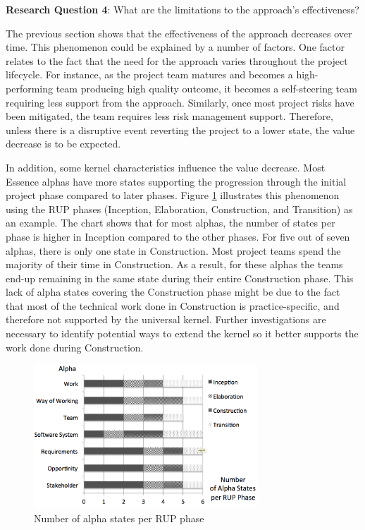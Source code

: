 \textbf{Research Question 4}: What are the limitations to the approach's effectiveness?

The previous section shows that the effectiveness of the approach decreases over time. This phenomenon could be explained by a number of factors. One factor relates to the fact that the need for the approach varies throughout the project lifecycle. For instance, as the project team matures and becomes a high-performing team producing high quality outcome, it becomes a self-steering team requiring less support from the approach. Similarly, once most project risks have been mitigated, the team requires less risk management support. Therefore, unless there is a disruptive event reverting the project to a lower state, the value decrease is to be expected.

In addition, some kernel characteristics influence the value decrease. Most Essence alphas have more states supporting the progression through the initial project phase compared to later phases. Figure \ref{NumberOfAlphaStatesPerRUPPhase} illustrates this phenomenon using the RUP \cite{KrollRUP} phases (Inception, Elaboration, Construction, and Transition) as an example. The chart shows that for most alphas, the number of states per phase is higher in Inception compared to the other phases. For five out of seven alphas, there is only one state in Construction. Most project teams spend the majority of their time in Construction. As a result, for these alphas the teams end-up remaining in the same state during their entire Construction phase. This lack of alpha states covering the Construction phase might be due to the fact that most of the technical work done in Construction is practice-specific, and therefore not supported by the universal kernel. Further investigations are necessary to identify potential ways to extend the kernel so it better supports the work done during Construction.

\begin{figure}[t]
\centering
\includegraphics[width=3.30in]{project_steering_images/NumberOfAlphaStatesPerRUPPhase.png}
\caption{Number of alpha states per RUP phase}
\label{NumberOfAlphaStatesPerRUPPhase}
\end{figure}

